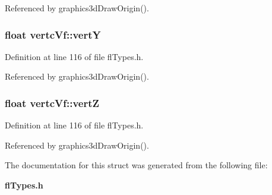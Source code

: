 Referenced by graphics3d\-Draw\-Origin().
\subsubsection{\setlength{\rightskip}{0pt plus 5cm}float {\bf vertc\-Vf::vert\-Y}}\label{structvertcVf_fb48ada98542053f7c40ded6139de5f3}




Definition at line 116 of file fl\-Types.h.

Referenced by graphics3d\-Draw\-Origin().
\subsubsection{\setlength{\rightskip}{0pt plus 5cm}float {\bf vertc\-Vf::vert\-Z}}\label{structvertcVf_b2ae8c31111f4df81abfc3471862fd79}




Definition at line 116 of file fl\-Types.h.

Referenced by graphics3d\-Draw\-Origin().

The documentation for this struct was generated from the following file:\begin{CompactItemize}
\item 
{\bf fl\-Types.h}\end{CompactItemize}
